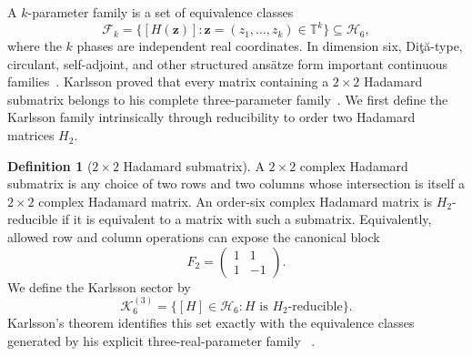 \documentclass[aps,prx,reprint,nofootinbib,twoside,superscriptaddress,longbibliography,floatfix]{revtex4-2}
\theoremstyle{definition}
\newtheorem{definition}[theorem]{Definition}
\newcommand{\T}{\mathbb T}
\newcommand{\HH}{\mathcal H}
\newcommand{\KK}{\mathcal K}
\begin{document}
A $k$-parameter family is a set of equivalence classes
\begin{equation}
\mathcal F_k=\{[H(\mathbf z)]:\mathbf z=(z_1,\ldots,z_k)\in\T^k\}
\subseteq\HH_6,
\end{equation}
where the $k$ phases are independent real coordinates.
%
In dimension six, Di\c{t}\u{a}-type, circulant, self-adjoint, and other structured ansätze form important continuous families~\cite{Dita2004,BeauchampNicoara2008,MatolcsiSzollosi2008,
Szollosi2010Hypocycloids}. 
Karlsson proved that every matrix containing a $2\times2$ Hadamard submatrix belongs to his complete three-parameter
family~\cite{Karlsson2011H2,Karlsson2011ThreeParameter}. 
%
We first define the Karlsson family intrinsically through reducibility to order two Hadamard matrices $H_2$.
\begin{definition}[$2\times2$ Hadamard submatrix]
A $2\times2$ complex Hadamard submatrix is any choice of two rows and two columns whose intersection is itself a $2\times2$ complex Hadamard matrix. An order-six complex Hadamard matrix is $H_2$-reducible if it is equivalent to a matrix with such a submatrix. Equivalently, allowed row and column operations can expose the
canonical block
\begin{equation}
F_2=\begin{pmatrix}1&1\\1&-1\end{pmatrix}.
\label{eq:F2}
\end{equation}
We define the Karlsson sector by
\begin{equation}
    \KK_6^{(3)}=\{[H]\in\HH_6:H\text{ is }H_2\text{-reducible}\}.
\label{eq:karlsson}
\end{equation}
Karlsson's theorem identifies this set exactly with the equivalence classes generated by his explicit three-real-parameter family
~\cite{Karlsson2011H2,Karlsson2011ThreeParameter}.
\end{definition}
\end{document}
